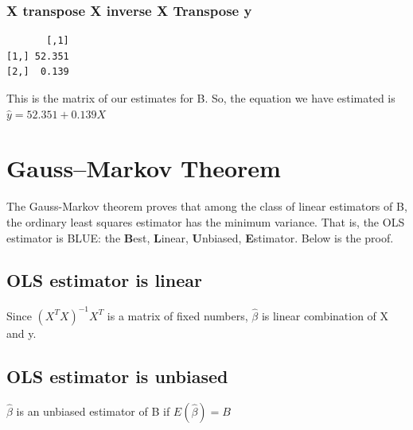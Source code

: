 \documentclass[]{book}
\newenvironment{Shaded}{\begin{snugshade}}{\end{snugshade}}
\newcommand{\NormalTok}[1]{#1}
\newcommand{\OperatorTok}[1]{\textcolor[rgb]{0.81,0.36,0.00}{\textbf{#1}}}
\newcommand{\StringTok}[1]{\textcolor[rgb]{0.31,0.60,0.02}{#1}}
\begin{document}
\hypertarget{x-transpose-x-inverse-x-transpose-y}{%
\subsubsection{X transpose X inverse X Transpose y}\label{x-transpose-x-inverse-x-transpose-y}}

\begin{Shaded}
\end{Shaded}

\begin{verbatim}
       [,1]
[1,] 52.351
[2,]  0.139
\end{verbatim}

This is the matrix of our estimates for B. So, the equation we have estimated is \(\hat{y} = 52.351 + 0.139X\)

\hypertarget{gaussmarkov-theorem}{%
\section{Gauss--Markov Theorem}\label{gaussmarkov-theorem}}

The Gauss-Markov theorem proves that among the class of linear estimators of B, the ordinary least squares estimator has the minimum variance. That is, the OLS estimator is BLUE: the \textbf{B}est, \textbf{L}inear, \textbf{U}nbiased, \textbf{E}stimator. Below is the proof.

\hypertarget{ols-estimator-is-linear}{%
\subsection{OLS estimator is linear}\label{ols-estimator-is-linear}}

Since \((X^TX)^{-1}X^T\) is a matrix of fixed numbers, \(\hat{\beta}\) is linear combination of X and y.

\hypertarget{ols-estimator-is-unbiased}{%
\subsection{OLS estimator is unbiased}\label{ols-estimator-is-unbiased}}

\(\hat{\beta}\) is an unbiased estimator of B if \(E(\hat{\beta})=B\)
\end{document}
